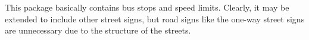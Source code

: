 This package basically contains bus stops and speed limits.
Clearly, it may be extended to include other street signs, but road signs like
the one-way street signs are unnecessary due to the structure of the streets.
